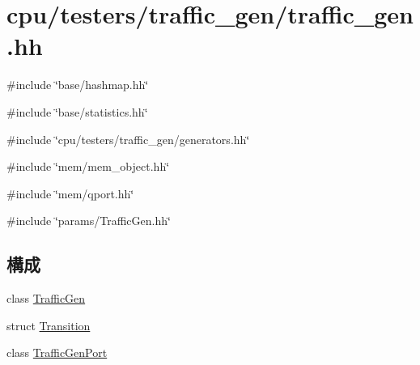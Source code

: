 \hypertarget{traffic__gen_8hh}{
\section{cpu/testers/traffic\_\-gen/traffic\_\-gen.hh}
\label{traffic__gen_8hh}
}
{\ttfamily \#include \char`\"{}base/hashmap.hh\char`\"{}}\par
{\ttfamily \#include \char`\"{}base/statistics.hh\char`\"{}}\par
{\ttfamily \#include \char`\"{}cpu/testers/traffic\_\-gen/generators.hh\char`\"{}}\par
{\ttfamily \#include \char`\"{}mem/mem\_\-object.hh\char`\"{}}\par
{\ttfamily \#include \char`\"{}mem/qport.hh\char`\"{}}\par
{\ttfamily \#include \char`\"{}params/TrafficGen.hh\char`\"{}}\par
\subsection*{構成}
\begin{DoxyCompactItemize}
\item 
class \hyperlink{classTrafficGen}{TrafficGen}
\item 
struct \hyperlink{structTrafficGen_1_1Transition}{Transition}
\item 
class \hyperlink{classTrafficGen_1_1TrafficGenPort}{TrafficGenPort}
\end{DoxyCompactItemize}
